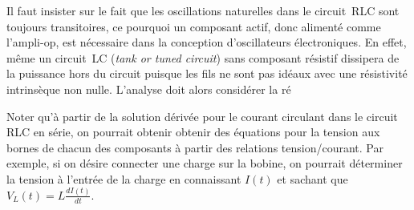 \documentclass[canadien,12pt,oneside,letterpaper]{article}
\begin{document}



Il faut insister sur le fait que les oscillations naturelles dans le circuit~RLC sont toujours transitoires, ce pourquoi un composant actif, donc alimenté comme l'ampli-op, est nécessaire dans la conception d'oscillateurs électroniques. En effet, même un circuit~LC (\textit{tank or tuned circuit}) sans composant résistif dissipera de la puissance hors du circuit puisque les fils ne sont pas idéaux avec une résistivité intrinsèque non nulle. L'analyse doit alors considérer la ré

 Noter qu'à partir de la solution dérivée pour le courant circulant dans le circuit RLC en série, on pourrait obtenir obtenir des équations pour la tension aux bornes de chacun des composants à partir des relations tension/courant. Par exemple, si on désire connecter une charge sur la bobine, on pourrait déterminer la tension à l'entrée de la charge en connaissant $I(t)$ et sachant que $V_L(t) = L\frac{dI(t)}{dt}$.
\end{document}
